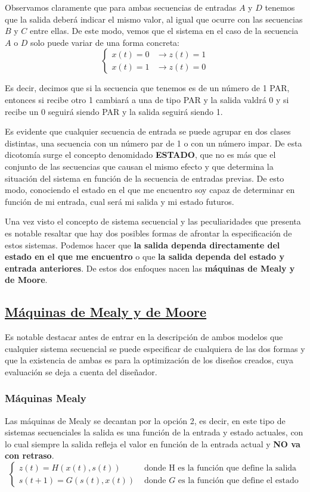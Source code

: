 \documentclass[a4paper,10pt]{book}
\begin{document}
Observamos claramente que para ambas secuencias de entradas $A$ y $D$ tenemos que la salida deberá indicar el mismo valor, al igual que ocurre con las secuencias $B$ y $C$ entre ellas. De este modo, vemos que el sistema en el caso de la secuencia $A$ o $D$ solo puede variar de una forma concreta:
$$\begin{cases}x(t)=0 & \rightarrow z(t)=1 \\ x(t)=1 & \rightarrow z(t)=0
\end{cases}$$

Es decir, decimos que si la secuencia que tenemos es de un número de 1 PAR, entonces si recibe otro 1 cambiará a una de tipo PAR y la salida valdrá 0 y si recibe un 0 seguirá siendo PAR y la salida seguirá siendo 1.\par

Es evidente que cualquier secuencia de entrada se puede agrupar en dos clases distintas, una secuencia con un número par de 1 o con un número impar. De esta dicotomía surge el concepto denomidado \textbf{ESTADO}, que no es más que el conjunto de las secuencias que causan el mismo efecto y que determina la situación del sistema en función de la secuencia de entradas previas. De esto modo, conociendo el estado en el que me encuentro soy capaz de determinar en función de mi entrada, cual será mi salida y mi estado futuros.

Una vez visto el concepto de sistema secuencial y las peculiaridades que presenta es notable resaltar que hay dos posibles formas de afrontar la especificación de estos sistemas. Podemos hacer que \textbf{la salida dependa directamente del estado en el que me encuentro} o que \textbf{la salida dependa del estado y entrada anteriores}. De estos dos enfoques nacen las \textbf{máquinas de Mealy y de Moore}.

\subsection*{\underline{Máquinas de Mealy y de Moore}}

Es notable destacar antes de entrar en la descripción de ambos modelos que cualquier sistema secuencial se puede especificar de cualquiera de las dos formas y que la existencia de ambas es para la optimización de los diseños creados, cuya evaluación se deja a cuenta del diseñador.
\subsubsection*{Máquinas Mealy}
Las máquinas de Mealy se decantan por la opción 2, es decir, en este tipo de sistemas secuenciales la salida es una función de la entrada y estado actuales, con lo cual siempre la salida refleja el valor en función de la entrada actual y \textbf{NO va con retraso}.
$$\begin{cases} z(t)=H(x(t),s(t)) & \mbox{ donde H es la función que define la salida} \\ s(t+1)=G(s(t),x(t)) & \mbox{ donde }G\mbox{ es la función que define el estado}\end{cases}$$
\end{document}
